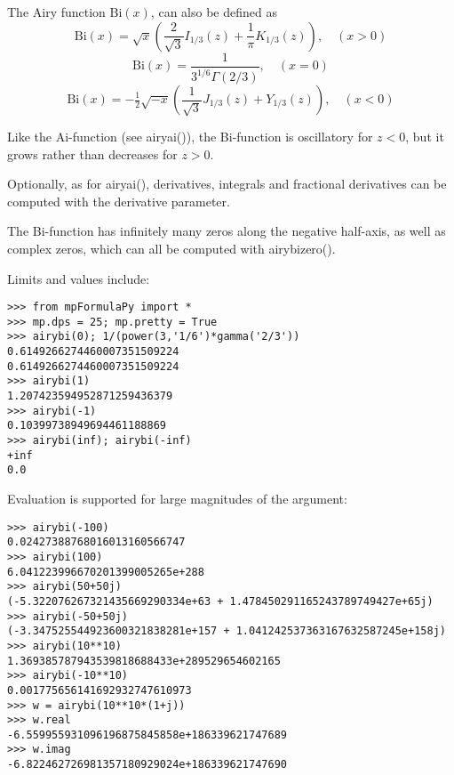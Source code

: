 \vspace{0.3cm}
The Airy function $\text{Bi}(x)$, can also be defined as
\begin{equation}
\text{Bi}(x) = \sqrt{x} \left(\frac{2}{\sqrt{3}}I_{1/3}(z) + \frac{1}{\pi} K_{1/3}(z) \right), \quad (x>0)
\end{equation}
\begin{equation}
\text{Bi}(x) = \frac{1}{3^{1/6}\Gamma(2/3)} , \quad (x=0)
\end{equation}
\begin{equation}
\text{Bi}(x) = -\tfrac{1}{2} \sqrt{-x} \left(\frac{1}{\sqrt{3}} J_{1/3}(z) + Y_{1/3}(z) \right), \quad (x<0)
\end{equation}




Like the Ai-function (see airyai()), the Bi-function is oscillatory for $z<0$, but it grows rather than decreases for $z>0$.

Optionally, as for airyai(), derivatives, integrals and fractional derivatives can be computed with the derivative parameter.

The Bi-function has infinitely many zeros along the negative half-axis, as well as complex zeros, which can all be computed with airybizero().


Limits and values include:

\begin{lstlisting}
>>> from mpFormulaPy import *
>>> mp.dps = 25; mp.pretty = True
>>> airybi(0); 1/(power(3,'1/6')*gamma('2/3'))
0.6149266274460007351509224
0.6149266274460007351509224
>>> airybi(1)
1.207423594952871259436379
>>> airybi(-1)
0.10399738949694461188869
>>> airybi(inf); airybi(-inf)
+inf
0.0
\end{lstlisting}

Evaluation is supported for large magnitudes of the argument:

\begin{lstlisting}
>>> airybi(-100)
0.02427388768016013160566747
>>> airybi(100)
6.041223996670201399005265e+288
>>> airybi(50+50j)
(-5.322076267321435669290334e+63 + 1.478450291165243789749427e+65j)
>>> airybi(-50+50j)
(-3.347525544923600321838281e+157 + 1.041242537363167632587245e+158j)
>>> airybi(10**10)
1.369385787943539818688433e+289529654602165
>>> airybi(-10**10)
0.001775656141692932747610973
>>> w = airybi(10**10*(1+j))
>>> w.real
-6.559955931096196875845858e+186339621747689
>>> w.imag
-6.822462726981357180929024e+186339621747690
\end{lstlisting}




